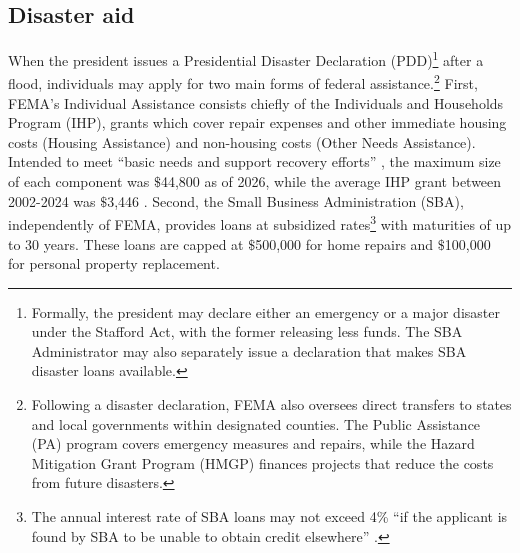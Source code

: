 \documentclass[12pt]{article}
\begin{document}
\subsection{Disaster aid}
When the president issues a Presidential Disaster Declaration (PDD)\footnote{Formally, the president may declare either an emergency or a major disaster under the Stafford Act, with the former releasing less funds. The SBA Administrator may also separately issue a declaration that makes SBA disaster loans available.} after a flood, individuals may apply for two main forms of federal assistance.\footnote{Following a disaster declaration, FEMA also oversees direct transfers to states and local governments within designated counties. The Public Assistance (PA) program covers emergency measures and repairs, while the Hazard Mitigation Grant Program (HMGP) finances projects that reduce the costs from future disasters.} First, FEMA's Individual Assistance consists chiefly of the Individuals and Households Program (IHP), grants which cover repair expenses and other immediate housing costs (Housing Assistance) and non-housing costs (Other Needs Assistance). Intended to meet ``basic needs and support recovery efforts'' \citep{crs2024disaster}, the maximum size of each component was $\$$44,800 as of 2026, while the average IHP grant between 2002-2024 was $\$$3,446 \citep{crs2025ihpfaq}. Second, the Small Business Administration (SBA), independently of FEMA, provides loans at subsidized rates\footnote{The annual interest rate of SBA loans may not exceed 4\% ``if the applicant is found 
by SBA to be unable to obtain credit elsewhere'' \citep[p.~2]{crs2024disaster}.} with maturities of up to 30 years. These loans are capped at $\$$500,000 for home repairs and $\$$100,000 for personal property replacement. 
\end{document}
